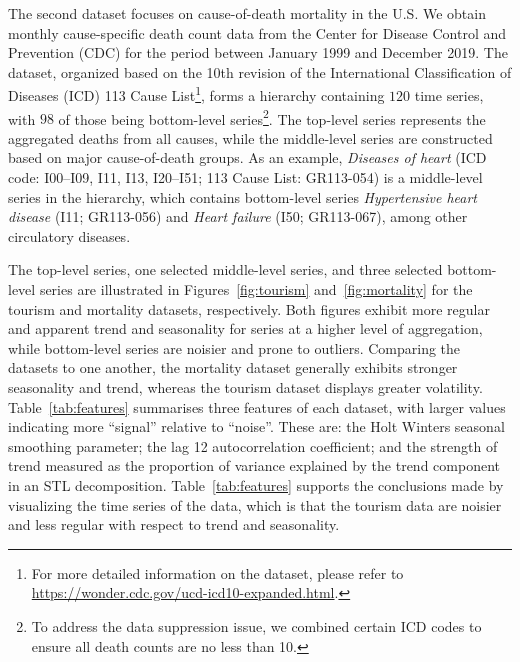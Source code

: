 \documentclass[a4paper,review,12pt,authoryear]{elsarticle}
\begin{document}
The second dataset focuses on cause-of-death mortality in the U.S. We obtain monthly cause-specific death count data from the Center for Disease Control and Prevention (CDC) for the period between January 1999 and December 2019. The dataset, organized based on the 10th revision of the International Classification of Diseases (ICD) 113 Cause List\footnote{For more detailed information on the dataset, please refer to \url{https://wonder.cdc.gov/ucd-icd10-expanded.html}.}, forms a hierarchy containing $120$ time series, with $98$ of those being bottom-level series\footnote{To address the data suppression issue, we combined certain ICD codes to ensure all death counts are no less than 10. }. The top-level series represents the aggregated deaths from all causes, while the middle-level series are constructed based on major cause-of-death groups. As an example, \textit{Diseases of heart} (ICD code: I00--I09, I11, I13, I20--I51; 113 Cause List: GR113-054) is a middle-level series in the hierarchy, which contains bottom-level series \textit{Hypertensive heart disease} (I11; GR113-056) and \textit{Heart failure} (I50; GR113-067), among other circulatory diseases.  


The top-level series, one selected middle-level series, and three selected bottom-level series are illustrated in Figures~\ref{fig:tourism} and~\ref{fig:mortality} for the tourism and mortality datasets, respectively. 
Both figures exhibit more regular and apparent trend and seasonality for series at a higher level of aggregation, while bottom-level series are noisier and prone to outliers. 
Comparing the datasets to one another, the mortality dataset generally exhibits stronger seasonality and trend, whereas the tourism dataset displays greater volatility. Table~\ref{tab:features} summarises three features of each dataset, with larger values indicating more ``signal'' relative to ``noise''. These are: the Holt Winters seasonal smoothing parameter; the lag 12 autocorrelation coefficient; and the strength of trend measured as the proportion of variance explained by the trend component in an STL decomposition. Table~\ref{tab:features} supports the conclusions made by visualizing the time series of the data, which is that the tourism data are noisier and less regular with respect to trend and seasonality.\\
\end{document}
